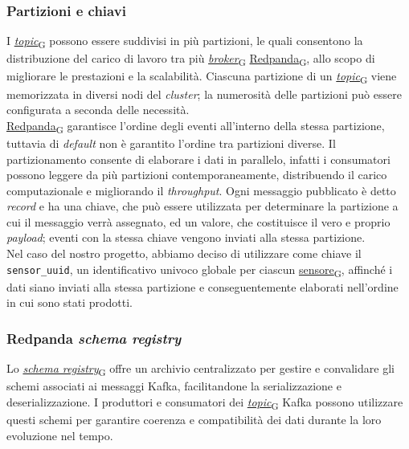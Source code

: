 \subsubsection{Partizioni e chiavi}
I \href{https://7last.github.io/docs/pb/documentazione-interna/glossario\#topic}{\textit{topic}\textsubscript{G}} possono essere suddivisi in più partizioni, le quali consentono la distribuzione del carico di lavoro tra più \href{https://7last.github.io/docs/pb/documentazione-interna/glossario\#broker}{\textit{broker}\textsubscript{G}} \href{https://7last.github.io/docs/pb/documentazione-interna/glossario\#redpanda}{Redpanda\textsubscript{G}},
allo scopo di migliorare le prestazioni e la scalabilità. Ciascuna partizione di un \href{https://7last.github.io/docs/pb/documentazione-interna/glossario\#topic}{\textit{topic}\textsubscript{G}} viene memorizzata in diversi nodi del \textit{cluster}; la numerosità
delle partizioni può essere configurata a seconda delle necessità.\\
\href{https://7last.github.io/docs/pb/documentazione-interna/glossario\#redpanda}{Redpanda\textsubscript{G}} garantisce l'ordine degli eventi all'interno della stessa partizione, tuttavia di \textit{default} non è garantito l'ordine tra partizioni diverse.
Il partizionamento consente di elaborare i dati in parallelo, infatti i consumatori possono leggere da più partizioni contemporaneamente, distribuendo il carico computazionale e migliorando il \textit{throughput}.
Ogni messaggio pubblicato è detto \textit{record} e ha una chiave, che può essere utilizzata per determinare la partizione a cui il messaggio verrà assegnato, ed un valore,
che costituisce il vero e proprio \textit{payload}; eventi con la stessa chiave vengono inviati alla stessa partizione.\\
Nel caso del nostro progetto, abbiamo deciso di utilizzare come chiave il \texttt{sensor\_uuid}, un identificativo univoco globale per ciascun \href{https://7last.github.io/docs/pb/documentazione-interna/glossario\#sensore}{sensore\textsubscript{G}}, affinché i dati
siano inviati alla stessa partizione e conseguentemente elaborati nell'ordine in cui sono stati prodotti.

\subsubsection{Redpanda \textit{schema registry}}
Lo \href{https://7last.github.io/docs/pb/documentazione-interna/glossario\#schema-registry}{\textit{schema registry}\textsubscript{G}} offre un archivio centralizzato per gestire e convalidare gli schemi associati ai messaggi Kafka, facilitandone la serializzazione e deserializzazione.
I produttori e consumatori dei \href{https://7last.github.io/docs/pb/documentazione-interna/glossario\#topic}{\textit{topic}\textsubscript{G}} Kafka possono utilizzare questi schemi per garantire coerenza e compatibilità dei dati durante la loro evoluzione nel tempo.

